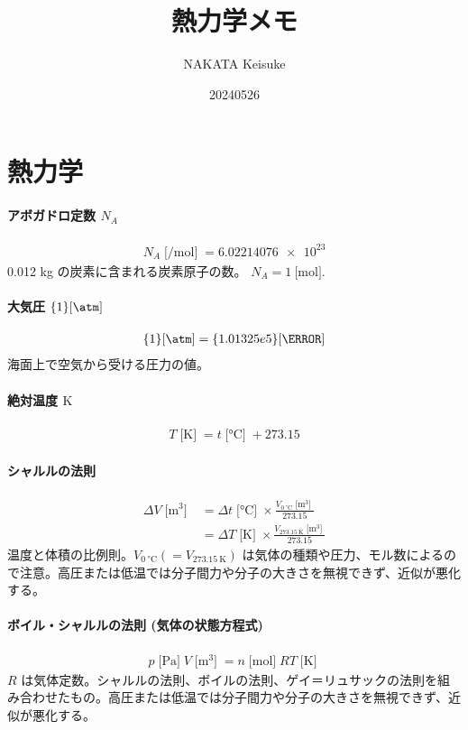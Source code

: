 \documentclass[a4paper,11pt]{jsarticle}
\newcommand{\braunit}[1]{\;\text{[}\unit{#1}\text{]}\;}
\begin{document}
\title{熱力学メモ}
\author{NAKATA Keisuke}
\date{20240526}
\maketitle


\part*{熱力学}

\subsection*{アボガドロ定数 $N_A$}
\begin{align*}
  N_A \braunit{\per\mol}= \num{6.02214076e23}
\end{align*}
0.012 kg の炭素に含まれる炭素原子の数。 $N_A = \qty{1}{[\mol]}$. \\
\cite[pp.1]{thermo}

\subsection*{大気圧 $\qty{1}{[\atm]}$}
\begin{align*}
  \qty{1}{[\atm]} = \qty{1.01325e5}{[\Pa]}
\end{align*}
海面上で空気から受ける圧力の値。 \\
\cite[pp.1]{thermo}

\subsection*{絶対温度 $\unit{\K}$}
\begin{align*}
  T \braunit{\K} = t \braunit{\celsius} + 273.15
\end{align*}
\cite[pp.10]{thermo}

\subsection*{シャルルの法則}
\begin{align*}
  \varDelta V\braunit{\m^3}
    &= \varDelta t\braunit{\celsius}\times\frac{V_{\qty{0}{\celsius}}\braunit{\m^3}}{273.15} \\
    &= \varDelta T\braunit{\K}\times\frac{V_{\qty{273.15}{\K}}\braunit{\m^3}}{273.15}
\end{align*}
温度と体積の比例則。$V_{\qty{0}{\celsius}} (=V_{\qty{273.15}{\K}})$ は気体の種類や圧力、モル数によるので注意。高圧または低温では分子間力や分子の大きさを無視できず、近似が悪化する。 \\
\cite[pp.10]{thermo}

\subsection*{ボイル・シャルルの法則 (気体の状態方程式)}
\begin{align*}
  p\braunit{\Pa}V\braunit{\m^3} = n\braunit{\mol}RT\braunit{\K}
\end{align*}
$R$ は気体定数。シャルルの法則、ボイルの法則、ゲイ＝リュサックの法則を組み合わせたもの。高圧または低温では分子間力や分子の大きさを無視できず、近似が悪化する。\\
\cite[pp.15]{thermo}



\end{document}
